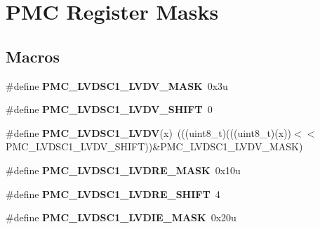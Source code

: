 \hypertarget{group__PMC__Register__Masks}{}\section{P\+MC Register Masks}
\label{group__PMC__Register__Masks}
\subsection*{Macros}
\begin{DoxyCompactItemize}
\item 
\#define {\bfseries P\+M\+C\+\_\+\+L\+V\+D\+S\+C1\+\_\+\+L\+V\+D\+V\+\_\+\+M\+A\+SK}~0x3u\hypertarget{group__PMC__Register__Masks_ga777eada2a526d88569a30323e9d3e1d3}{}\label{group__PMC__Register__Masks_ga777eada2a526d88569a30323e9d3e1d3}

\item 
\#define {\bfseries P\+M\+C\+\_\+\+L\+V\+D\+S\+C1\+\_\+\+L\+V\+D\+V\+\_\+\+S\+H\+I\+FT}~0\hypertarget{group__PMC__Register__Masks_gaaf45daa6de387f93bc57f1218ab17a16}{}\label{group__PMC__Register__Masks_gaaf45daa6de387f93bc57f1218ab17a16}

\item 
\#define {\bfseries P\+M\+C\+\_\+\+L\+V\+D\+S\+C1\+\_\+\+L\+V\+DV}(x)~(((uint8\+\_\+t)(((uint8\+\_\+t)(x))$<$$<$P\+M\+C\+\_\+\+L\+V\+D\+S\+C1\+\_\+\+L\+V\+D\+V\+\_\+\+S\+H\+I\+FT))\&P\+M\+C\+\_\+\+L\+V\+D\+S\+C1\+\_\+\+L\+V\+D\+V\+\_\+\+M\+A\+SK)\hypertarget{group__PMC__Register__Masks_gae2cf4048ec29cc1a54349d8bc18e27e4}{}\label{group__PMC__Register__Masks_gae2cf4048ec29cc1a54349d8bc18e27e4}

\item 
\#define {\bfseries P\+M\+C\+\_\+\+L\+V\+D\+S\+C1\+\_\+\+L\+V\+D\+R\+E\+\_\+\+M\+A\+SK}~0x10u\hypertarget{group__PMC__Register__Masks_gad771f87e373907e3ef60e5fa31001fad}{}\label{group__PMC__Register__Masks_gad771f87e373907e3ef60e5fa31001fad}

\item 
\#define {\bfseries P\+M\+C\+\_\+\+L\+V\+D\+S\+C1\+\_\+\+L\+V\+D\+R\+E\+\_\+\+S\+H\+I\+FT}~4\hypertarget{group__PMC__Register__Masks_ga056ca878a20782f5bf65b3be3e98581d}{}\label{group__PMC__Register__Masks_ga056ca878a20782f5bf65b3be3e98581d}

\item 
\#define {\bfseries P\+M\+C\+\_\+\+L\+V\+D\+S\+C1\+\_\+\+L\+V\+D\+I\+E\+\_\+\+M\+A\+SK}~0x20u\hypertarget{group__PMC__Register__Masks_ga1e7518c88ea0037d099124a643788363}{}\label{group__PMC__Register__Masks_ga1e7518c88ea0037d099124a643788363}


\end{DoxyCompactItemize}
